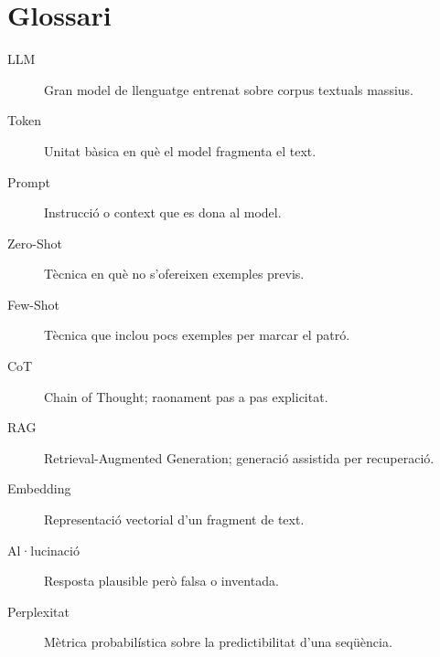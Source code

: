 \documentclass[12pt,a4paper]{report}
\begin{document}
\section*{Glossari}
\begin{description}
  \item[LLM] Gran model de llenguatge entrenat sobre corpus textuals massius.
  \item[Token] Unitat bàsica en què el model fragmenta el text.
  \item[Prompt] Instrucció o context que es dona al model.
  \item[Zero-Shot] Tècnica en què no s'ofereixen exemples previs.
  \item[Few-Shot] Tècnica que inclou pocs exemples per marcar el patró.
  \item[CoT] Chain of Thought; raonament pas a pas explicitat.
  \item[RAG] Retrieval-Augmented Generation; generació assistida per recuperació.
  \item[Embedding] Representació vectorial d'un fragment de text.
  \item[Al·lucinació] Resposta plausible però falsa o inventada.
  \item[Perplexitat] Mètrica probabilística sobre la predictibilitat d'una seqüència.
\end{description}
\end{document}
